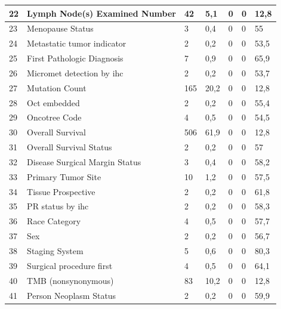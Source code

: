 \begin{table}[hbt!]
\begin{threeparttable}
\begin{tabular}{p{0.5cm} p{4cm} p{1.5cm} p{2cm} p{1.5cm} p{2cm} p{1.5cm}}
			\\ \hline	22	&	Lymph Node(s) Examined Number	&	42	&	5,1	&	0	&	0	&	12,8
			\\ \hline	23	&	Menopause Status	&	3	&	0,4	&	0	&	0	&	55
			\\ \hline	24	&	Metastatic tumor indicator	&	2	&	0,2	&	0	&	0	&	53,5
			\\ \hline	25	&	First Pathologic Diagnosis 	&	7	&	0,9	&	0	&	0	&	65,9
			\\ \hline	26	&	Micromet detection by ihc	&	2	&	0,2	&	0	&	0	&	53,7
			\\ \hline	27	&	Mutation Count	&	165	&	20,2	&	0	&	0	&	12,8
			\\ \hline	28	&	Oct embedded	&	2	&	0,2	&	0	&	0	&	55,4
			\\ \hline	29	&	Oncotree Code	&	4	&	0,5	&	0	&	0	&	54,5
			\\ \hline	30	&	Overall Survival	&	506	&	61,9	&	0	&	0	&	12,8
			\\ \hline	31	&	Overall Survival Status	&	2	&	0,2	&	0	&	0	&	57
			\\ \hline	32	&	Disease Surgical Margin Status	&	3	&	0,4	&	0	&	0	&	58,2
			\\ \hline	33	&	Primary Tumor Site	&	10	&	1,2	&	0	&	0	&	57,5
			\\ \hline	34	&	Tissue Prospective 	&	2	&	0,2	&	0	&	0	&	61,8
			\\ \hline   35	&	PR status by ihc	&	2	&	0,2	&	0	&	0	&	58,3
			\\ \hline	36	&	Race Category	&	4	&	0,5	&	0	&	0	&	57,7
			\\ \hline	37	&	Sex	&	2	&	0,2	&	0	&	0	&	56,7
			\\ \hline	38	&	Staging System	&	5	&	0,6	&	0	&	0	&	80,3
			\\ \hline	39	&	Surgical procedure first	&	4	&	0,5	&	0	&	0	&	64,1
			\\ \hline	40	&	TMB (nonsynonymous)	&	83	&	10,2	&	0	&	0	&	12,8
			\\ \hline	41	&	Person Neoplasm Status	&	2	&	0,2	&	0	&	0	&	59,9
			\\ \hline
		\end{tabular}
	\end{threeparttable}
\end{table}

\clearpage
